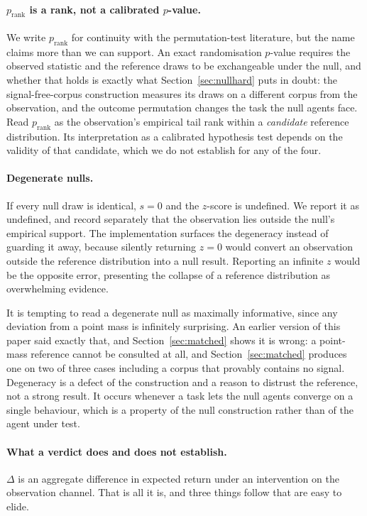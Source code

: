\documentclass[10pt,twocolumn]{article}
\begin{document}
\paragraph{$p_{\mathrm{rank}}$ is a rank, not a calibrated $p$-value.}
We write $p_{\mathrm{rank}}$ for continuity with the permutation-test literature,
but the name claims more than we can support. An exact randomisation $p$-value
requires the observed statistic and the reference draws to be exchangeable under
the null, and whether that holds is exactly what Section~\ref{sec:nullhard}
puts in doubt: the signal-free-corpus construction measures its draws on a
different corpus from the observation, and the outcome permutation changes the
task the null agents face. Read $p_{\mathrm{rank}}$ as the observation's
empirical tail rank within a \emph{candidate} reference distribution. Its
interpretation as a calibrated hypothesis test depends on the validity of that
candidate, which we do not establish for any of the four.

\paragraph{Degenerate nulls.} If every null draw is identical, $s=0$ and the
$z$-score is undefined. We report it as undefined, and
record separately that the observation lies outside the null's empirical
support. The implementation surfaces the degeneracy instead of guarding it
away, because silently returning $z=0$ would convert an observation outside the
reference distribution into a null result. Reporting an infinite $z$ would be
the opposite error, presenting the collapse of a reference distribution as
overwhelming evidence.

It is tempting to read a degenerate null as maximally informative, since any
deviation from a point mass is infinitely surprising. An earlier version of this
paper said exactly that, and Section~\ref{sec:matched} shows it is wrong: a
point-mass reference cannot be consulted at all, and
Section~\ref{sec:matched} produces one on two of three cases including a corpus
that provably contains no signal. Degeneracy is a defect of the
construction and a reason to distrust the reference, not a strong result. It
occurs whenever a task lets the null agents converge on a single behaviour,
which is a property of the null construction rather than of the agent under
test.

\paragraph{What a verdict does and does not establish.}
\label{par:scope}
$\Delta$ is an aggregate difference in expected return under an intervention on
the observation channel. That is all it is, and three things follow that are
easy to elide.
\end{document}

